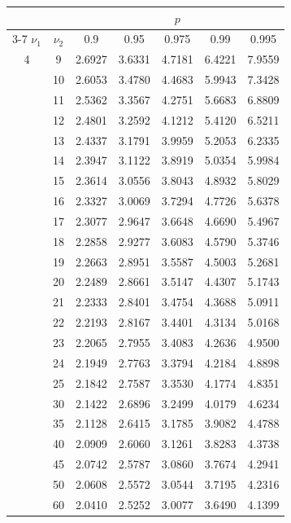 \hfill
\begin{minipage}{0.49\textwidth}
	\begin{center}
		\begin{tabular}{ccccccc}
			& & \multicolumn{5}{c}{$p$}\\
			\cline{3-7}
			$\nu_1$ & $\nu_2$ & 0.9 & 0.95 & 0.975 & 0.99 & 0.995 \\
			\midrule
			4 & 9 & 2.6927 & 3.6331 & 4.7181 & 6.4221 & 7.9559 \\[5pt]
			& 10 & 2.6053 & 3.4780 & 4.4683 & 5.9943 & 7.3428 \\
			& 11 & 2.5362 & 3.3567 & 4.2751 & 5.6683 & 6.8809 \\
			& 12 & 2.4801 & 3.2592 & 4.1212 & 5.4120 & 6.5211 \\
			& 13 & 2.4337 & 3.1791 & 3.9959 & 5.2053 & 6.2335 \\
			& 14 & 2.3947 & 3.1122 & 3.8919 & 5.0354 & 5.9984 \\
			& 15 & 2.3614 & 3.0556 & 3.8043 & 4.8932 & 5.8029 \\
			& 16 & 2.3327 & 3.0069 & 3.7294 & 4.7726 & 5.6378 \\
			& 17 & 2.3077 & 2.9647 & 3.6648 & 4.6690 & 5.4967 \\
			& 18 & 2.2858 & 2.9277 & 3.6083 & 4.5790 & 5.3746 \\
			& 19 & 2.2663 & 2.8951 & 3.5587 & 4.5003 & 5.2681 \\[5pt]
			& 20 & 2.2489 & 2.8661 & 3.5147 & 4.4307 & 5.1743 \\
			& 21 & 2.2333 & 2.8401 & 3.4754 & 4.3688 & 5.0911 \\
			& 22 & 2.2193 & 2.8167 & 3.4401 & 4.3134 & 5.0168 \\
			& 23 & 2.2065 & 2.7955 & 3.4083 & 4.2636 & 4.9500 \\
			& 24 & 2.1949 & 2.7763 & 3.3794 & 4.2184 & 4.8898 \\
			& 25 & 2.1842 & 2.7587 & 3.3530 & 4.1774 & 4.8351 \\
			& 30 & 2.1422 & 2.6896 & 3.2499 & 4.0179 & 4.6234 \\
			& 35 & 2.1128 & 2.6415 & 3.1785 & 3.9082 & 4.4788 \\
			& 40 & 2.0909 & 2.6060 & 3.1261 & 3.8283 & 4.3738 \\
			& 45 & 2.0742 & 2.5787 & 3.0860 & 3.7674 & 4.2941 \\[5pt]
			& 50 & 2.0608 & 2.5572 & 3.0544 & 3.7195 & 4.2316 \\
			& 60 & 2.0410 & 2.5252 & 3.0077 & 3.6490 & 4.1399 \\

\end{tabular}
\end{center}
\end{minipage}
